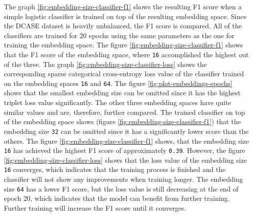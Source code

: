 \newline
The graph \ref{fig:embedding-size-classifier-f1} shows the resulting F1 score when a simple logistic classifier is trained on top of the resulting embedding space. Since the \gls{DCASE} dataset is heavily unbalanced, the F1 score is compared. All of the classifiers are trained for 20 epochs using the same parameters as the one for training the embedding space. The figure \ref{fig:embedding-size-classifier-f1} shows that the F1 score of the embedding space, where \texttt{16} accomplished the highest out of the three. The graph \ref{fig:embedding-size-classifier-loss} shows the corresponding sparse categorical cross-entropy loss value of the classifier trained on the embedding spaces \texttt{16} and \texttt{64}.
\newline
\newline
The figure \ref{fig:plot-embeddings-epochs} shows that the smallest embedding size can be omitted since it has the highest triplet loss value significantly. The other three embedding spaces have quite similar values and are, therefore, further compared. The trained classifier on top of the embedding space shows (figure \ref{fig:embedding-size-classifier-f1}) that the embedding size \texttt{32} can be omitted since it has a significantly lower score than the others. The figure \ref{fig:embedding-size-classifier-f1} shows, that the embedding size \texttt{16} has achieved the highest F1 score of approximately \texttt{0.39}. However, the figure \ref{fig:embedding-size-classifier-loss} shows that the loss value of the embedding size \texttt{16} converges, which indicates that the training process is finished and the classifier will not show any improvements when training longer. The embedding size \texttt{64} has a lower F1 score, but the loss value is still decreasing at the end of epoch 20, which indicates that the model can benefit from further training. Further training will increase the F1 score until it converges.
